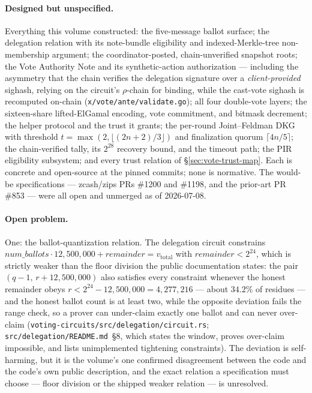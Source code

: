 \documentclass[11pt,a4paper]{article}
\theoremstyle{definition}
\begin{document}
\paragraph{Designed but unspecified.} Everything this volume constructed:
the five-message ballot surface; the delegation relation with its
note-bundle eligibility and indexed-Merkle-tree non-membership argument;
the coordinator-posted, chain-unverified snapshot roots; the Vote
Authority Note and its synthetic-action authorization --- including the
asymmetry that the chain verifies the delegation signature over a
\emph{client-provided} sighash, relying on the circuit's $\rho$-chain for
binding, while the cast-vote sighash is recomputed on-chain
(\texttt{x/vote/ante/validate.go}); all four double-vote layers; the
sixteen-share lifted-ElGamal encoding, vote commitment, and bitmask
decrement; the helper protocol and the trust it grants; the per-round
Joint--Feldman DKG with threshold $t = \max(2, \lfloor (2n+2)/3 \rfloor)$
and finalization quorum $\lceil 4n/5 \rceil$; the chain-verified tally,
its $2^{28}$ recovery bound, and the timeout path; the PIR eligibility
subsystem; and every trust relation of \S\ref{sec:vote-trust-map}. Each is
concrete and open-source at the pinned commits; none is normative. The
would-be specifications --- zcash/zips PRs \#1200 and \#1198, and the
prior-art PR \#853 --- were all open and unmerged as of 2026-07-08.

\paragraph{Open problem.} One: the ballot-quantization relation. The
delegation circuit constrains
$\mathit{num\_ballots} \cdot 12{,}500{,}000 + \mathit{remainder} =
v_{\mathrm{total}}$ with $\mathit{remainder} < 2^{24}$, which is strictly
weaker than the floor division the public documentation states: the pair
$(q-1,\, r+12{,}500{,}000)$ also satisfies every constraint whenever the
honest remainder obeys
$r < 2^{24} - 12{,}500{,}000 = 4{,}277{,}216$ --- about $34.2\%$ of
residues --- and the honest ballot count is at least two, while the
opposite deviation fails the range check, so a
prover can under-claim exactly one ballot and can never over-claim
(\texttt{voting-circuits/src/delegation/circuit.rs};
\texttt{src/delegation/README.md}~\S8, which states the window, proves
over-claim impossible, and lists unimplemented tightening constraints).
The deviation is self-harming, but it is the volume's one confirmed
disagreement between the code and the code's own public description, and
the exact relation a specification must choose --- floor division or the
shipped weaker relation --- is unresolved.
\end{document}
